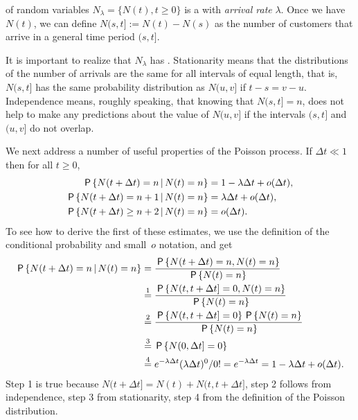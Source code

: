 \documentclass[stochastic-or.tex]{subfiles}
\begin{document}
 of random variables $N_\lambda=\{N(t), t\geq 0\}$ is a  with \emph{arrival rate} $\lambda$.
Once we have $N(t)$, we can define $N(s, t] := N(t)-N(s)$ as the number of customers that arrive in a general time period $(s, t]$.\marginnote{Note that $[0,t]$ is closed at both ends, but $(s,t]$ is open at the left.}

It is important to realize that  $N_\lambda$ has .
Stationarity means that the distributions of the number of arrivals are the same for all intervals of equal length, that is,
$N(s,t]$ has the same probability distribution as $N(u, v]$ if $t-s = v-u$.
Independence means, roughly speaking, that knowing that $N(s,t]= n$, does not help to make any predictions about the value of $N(u, v]$ if the intervals $(s,t]$ and $(u, v]$ do not overlap.

We next address a number of useful properties of the Poisson process.
If $\Delta t\ll 1$ then for all $t\geq 0$,
\begin{subequations}\label{eq:32}
\begin{align}
\,\mathsf{P}\left\{N(t+\Delta t) = n \,\middle|\, N(t) = n\right\} &= 1-\lambda \Delta t + o(\Delta t),  \\
\,\mathsf{P}\left\{N(t+\Delta t) = n+1 \,\middle|\, N(t) = n\right\} &= \lambda \Delta t + o(\Delta t), \label{eq:8} \\
\,\mathsf{P}\left\{N(t+\Delta t) \geq n+2 \,\middle|\, N(t) = n\right\} &= o(\Delta t).\label{eq:10}
\end{align}
\end{subequations}
To see how to derive the first of these estimates,  we use the definition of the conditional probability and small~$o$ notation, and get
 \begin{align*}
 \,\mathsf{P}\left\{N(t+\Delta t) = n \,\middle|\, N(t) = n\right\}
&= \frac{\,\mathsf{P}\left\{N(t+\Delta t) = n, N(t) = n\right\}}{\,\mathsf{P}\left\{N(t)=n\right\}} \\
&\stackrel1= \frac{\,\mathsf{P}\left\{N(t, t+\Delta t] = 0, N(t) = n\right\}}{\,\mathsf{P}\left\{N(t)=n\right\}} \\
&\stackrel2= \frac{\,\mathsf{P}\left\{N(t, t+\Delta t] = 0\right\} \,\mathsf{P}\left\{N(t) = n\right\}}{\,\mathsf{P}\left\{N(t)=n\right\}} \\
&\stackrel3= \,\mathsf{P}\left\{N(0, \Delta t] = 0\right\} \\
&\stackrel4= e^{-\lambda \Delta t} (\lambda \Delta t)^0/0!
= e^{-\lambda \Delta t} = 1-\lambda \Delta t + o(\Delta t).
 \end{align*}
Step 1 is true because $N(t+\Delta t]= N(t) + N(t, t+\Delta t]$, step 2 follows from independence, step 3 from stationarity, step 4 from the definition of the Poisson distribution.
\end{document}
